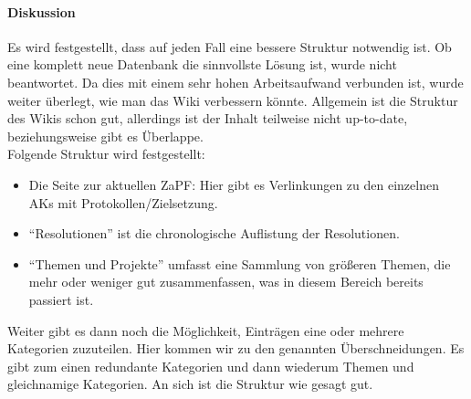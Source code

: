    \paragraph{Diskussion}
      Es wird festgestellt, dass auf jeden Fall eine bessere Struktur notwendig ist. Ob eine komplett neue Datenbank die sinnvollste Lösung ist, wurde nicht beantwortet. Da dies mit einem sehr hohen Arbeitsaufwand verbunden ist, wurde weiter überlegt, wie man das Wiki verbessern könnte.
      Allgemein ist die Struktur des Wikis schon gut, allerdings ist der Inhalt teilweise nicht up-to-date, beziehungsweise gibt es Überlappe. \\

      Folgende Struktur wird festgestellt: \\

      \begin{itemize}
        \item Die Seite zur aktuellen ZaPF: Hier gibt es Verlinkungen zu den einzelnen AKs mit Protokollen/Zielsetzung.
        \item ``Resolutionen'' ist die chronologische Auflistung der Resolutionen.
        \item ``Themen und Projekte'' umfasst eine Sammlung von größeren Themen, die mehr oder weniger gut zusammenfassen, was in diesem Bereich bereits passiert ist.
      \end{itemize}
      Weiter gibt es dann noch die Möglichkeit, Einträgen eine oder mehrere Kategorien zuzuteilen. Hier kommen wir zu den genannten Überschneidungen. Es gibt zum einen redundante Kategorien und dann wiederum Themen und gleichnamige Kategorien.
      An sich ist die Struktur wie gesagt gut.
